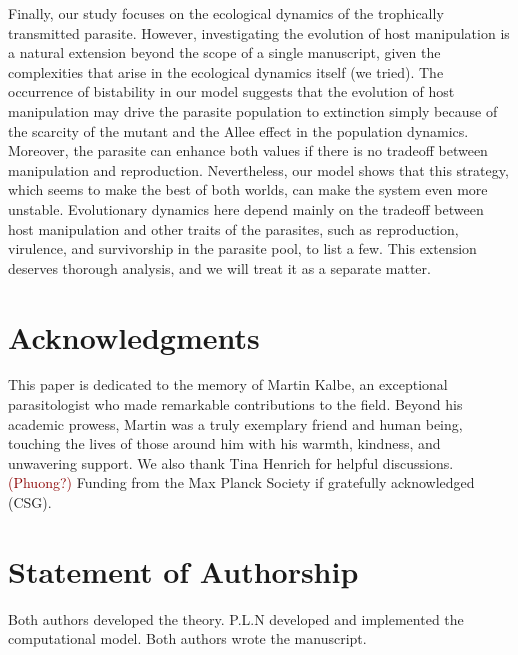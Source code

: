 \documentclass[11pt]{article}
\newcommand{\cha}[1]{\textcolor{darkred}{(#1)}}
\begin{document}
Finally, our study focuses on the ecological dynamics of the trophically transmitted parasite. 
However, investigating the evolution of host manipulation is a natural extension beyond the scope of a single manuscript, given the complexities that arise in the ecological dynamics itself (we tried). 
The occurrence of bistability in our model suggests that the evolution of host manipulation may drive the parasite population to extinction simply because of the scarcity of the mutant and the Allee effect in the population dynamics. 
Moreover, the parasite can enhance both values if there is no tradeoff between manipulation and reproduction. 
Nevertheless, our model shows that this strategy, which seems to make the best of both worlds, can make the system even more unstable. 
Evolutionary dynamics here depend mainly on the tradeoff between host manipulation and other traits of the parasites, such as reproduction, virulence, and survivorship in the parasite pool, to list a few. 
This extension deserves thorough analysis, and we will treat it as a separate matter.




 \section*{Acknowledgments}
This paper is dedicated to the memory of Martin Kalbe, an exceptional parasitologist who made remarkable contributions to the field.
Beyond his academic prowess, Martin was a truly exemplary friend and human being, touching the lives of those around him with his warmth, kindness, and unwavering support. 
We also thank Tina Henrich for helpful discussions.
\cha{Phuong?}
Funding from the Max Planck Society if gratefully acknowledged (CSG).

 \section*{Statement of Authorship}
Both authors developed the theory.
P.L.N developed and implemented the computational model.
Both authors wrote the manuscript.
 
\end{document}
